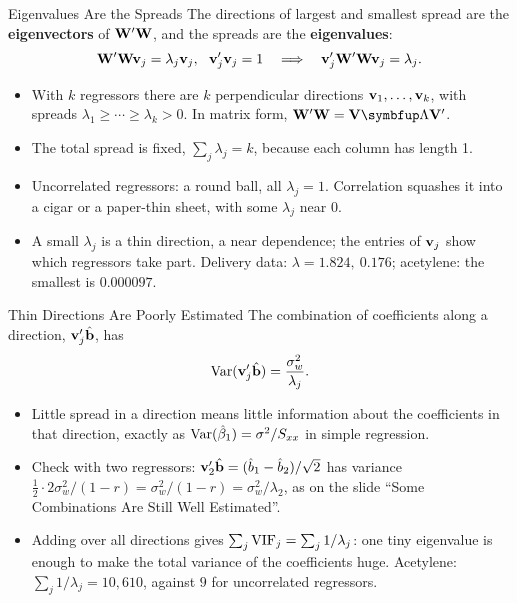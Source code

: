 \begin{frame}{Eigenvalues Are the Spreads}
    \small
    The directions of largest and smallest spread are the \textbf{eigenvectors} of $\mathbf{W}'\mathbf{W}$, and the spreads are the \textbf{eigenvalues}:
    \[
    \mathbf{W}'\mathbf{W}\mathbf{v}_j=\lambda_j\mathbf{v}_j,\ \ \mathbf{v}_j'\mathbf{v}_j=1
    \quad\Longrightarrow\quad
    \mathbf{v}_j'\mathbf{W}'\mathbf{W}\mathbf{v}_j=\lambda_j .
    \]
    \begin{itemize}
        \item With $k$ regressors there are $k$ perpendicular directions $\mathbf{v}_1,\dots,\mathbf{v}_k$, with spreads $\lambda_1\ge\cdots\ge\lambda_k>0$. In matrix form, $\bW'\bW=\bV\bLambda\bV'$.
        \item The total spread is fixed, $\sum_j\lambda_j=k$, because each column has length 1.
        \item Uncorrelated regressors: a round ball, all $\lambda_j=1$. Correlation squashes it into a cigar or a paper-thin sheet, with some $\lambda_j$ near 0.
        \item A small $\lambda_j$ is a thin direction, a near dependence; the entries of $\mathbf{v}_j$ show which regressors take part. Delivery data: $\lambda=1.824,\ 0.176$; acetylene: the smallest is $0.000097$.
    \end{itemize}
\end{frame}


\begin{frame}{Thin Directions Are Poorly Estimated}
    \small
    The combination of coefficients along a direction, $\mathbf{v}_j'\hat{\mathbf{b}}$, has
    \[
    \operatorname{Var}(\mathbf{v}_j'\hat{\mathbf{b}})=\frac{\sigma_w^2}{\lambda_j} .
    \]
    \begin{itemize}
        \item Little spread in a direction means little information about the coefficients in that direction, exactly as $\operatorname{Var}(\hat\beta_1)=\sigma^2/S_{xx}$ in simple regression.
        \item Check with two regressors: $\mathbf{v}_2'\hat{\mathbf{b}}=(\hat b_1-\hat b_2)/\sqrt2$ has variance $\tfrac12\cdot2\sigma_w^2/(1-r)=\sigma_w^2/(1-r)=\sigma_w^2/\lambda_2$, as on the slide ``Some Combinations Are Still Well Estimated''.
        \item Adding over all directions gives $\sum_j\mathrm{VIF}_j=\sum_j1/\lambda_j$: one tiny eigenvalue is enough to make the total variance of the coefficients huge. Acetylene: $\sum_j1/\lambda_j=10{,}610$, against $9$ for uncorrelated regressors.
    \end{itemize}
\end{frame}


